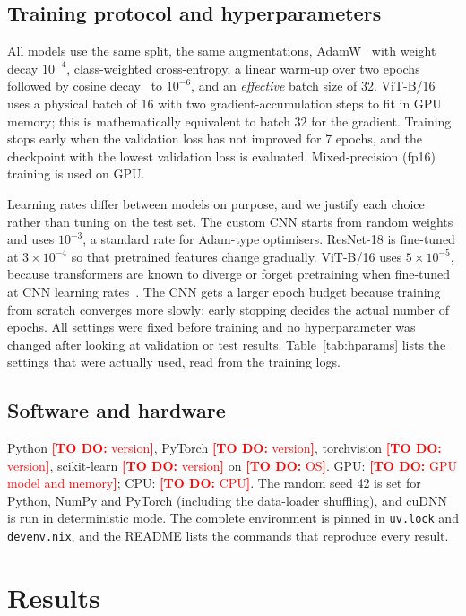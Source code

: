 \documentclass[11pt,a4paper]{article}
\newcommand{\fillin}[1]{\textcolor{red}{\textbf{[TO DO:} #1\textbf{]}}}
\providecommand{\Seed}{42}
\providecommand{\EnvPython}{\fillin{version}}
\providecommand{\EnvTorch}{\fillin{version}}
\providecommand{\EnvTorchvision}{\fillin{version}}
\providecommand{\EnvSklearn}{\fillin{version}}
\providecommand{\EnvGPU}{\fillin{GPU model and memory}}
\providecommand{\EnvCPU}{\fillin{CPU}}
\providecommand{\EnvOS}{\fillin{OS}}
\begin{document}
\subsection{Training protocol and hyperparameters}
All models use the same split, the same augmentations, AdamW~\cite{loshchilov2019} with weight decay $10^{-4}$, class-weighted cross-entropy, a linear warm-up over two epochs followed by cosine decay~\cite{loshchilov2017} to $10^{-6}$, and an \emph{effective} batch size of 32. ViT-B/16 uses a physical batch of 16 with two gradient-accumulation steps to fit in GPU memory; this is mathematically equivalent to batch 32 for the gradient. Training stops early when the validation loss has not improved for 7 epochs, and the checkpoint with the lowest validation loss is evaluated. Mixed-precision (fp16) training is used on GPU.

Learning rates differ between models on purpose, and we justify each choice rather than tuning on the test set. The custom CNN starts from random weights and uses $10^{-3}$, a standard rate for Adam-type optimisers. ResNet-18 is fine-tuned at $3\times10^{-4}$ so that pretrained features change gradually. ViT-B/16 uses $5\times10^{-5}$, because transformers are known to diverge or forget pretraining when fine-tuned at CNN learning rates~\cite{steiner2022}. The CNN gets a larger epoch budget because training from scratch converges more slowly; early stopping decides the actual number of epochs. All settings were fixed before training and no hyperparameter was changed after looking at validation or test results. Table~\ref{tab:hparams} lists the settings that were actually used, read from the training logs.


\subsection{Software and hardware}
Python \EnvPython, PyTorch \EnvTorch, torchvision \EnvTorchvision, scikit-learn \EnvSklearn{} on \EnvOS. GPU: \EnvGPU; CPU: \EnvCPU. The random seed \Seed{} is set for Python, NumPy and PyTorch (including the data-loader shuffling), and cuDNN is run in deterministic mode. The complete environment is pinned in \texttt{uv.lock} and \texttt{devenv.nix}, and the README lists the commands that reproduce every result.

\section{Results}\label{sec:results}
\end{document}
